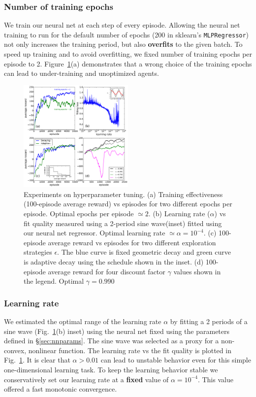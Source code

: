 \documentclass[conference]{IEEEtran}
\begin{document}
\subsubsection {Number of training epochs}
We train our neural net at each step of every episode. Allowing the neural net training to run for the default number of  epochs (200 in sklearn's {\tt MLPRegressor}) not only increases the training period, but also {\bf overfits} to the given batch. To speed up training and to avoid overfitting, we fixed number of training epochs per episode to 2. Figure~\ref{fig:lr}(a) demonstrates that a wrong choice of the training epochs can lead to under-training and unoptimized agents.
\begin{figure}[tbp]
    \centering
    \includegraphics[width=0.5\textwidth]{./figures/fig0.pdf}
    \caption{Experiments on hyperparameter tuning. (a) Training effectiveness (100-episode average reward) vs episodes for two different epochs per episode. Optimal epochs per episode $\simeq 2$. (b) Learning rate ($\alpha$) vs fit quality measured using a 2-period sine wave(inset) fitted using our neural net regressor. Optimal learning rate $\simeq \alpha=10^{-4}$. (c) 100-episode average reward vs episodes for two different exploration strategies $\epsilon$. The {\color{blue} blue} curve is fixed geometric decay and {\color{green} green} curve is adaptive decay using the schedule shown in the inset. (d) 100-episode average reward for four discount factor $\gamma$ values shown in the legend. Optimal $\gamma = 0.990$\label{fig:lr}}
\end{figure}
\subsubsection{Learning rate}
We estimated the optimal range of the learning rate $\alpha$ by fitting a 2 periods of a sine wave (Fig.~\ref{fig:lr}(b) inset) using the neural net fixed using the parameters defined in \S\ref{sec:nnparams}. The sine wave was selected as a proxy for a non-convex, nonlinear function. The learning rate vs the fit quality is plotted in Fig.~\ref{fig:lr}. It is clear that $\alpha>0.01$ can lead to unstable behavior even for this simple one-dimensional learning task. To keep the learning behavior stable we conservatively set our learning rate at a {\bf fixed } value of $\alpha = 10^{-4}$. This value offered a fast monotonic convergence.
\end{document}
